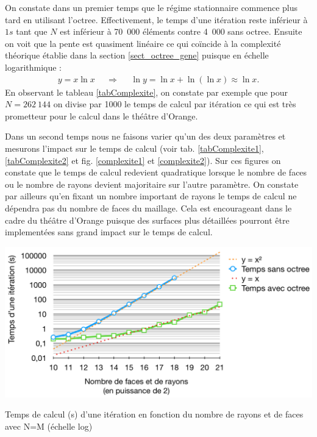 On constate dans un premier temps que le régime stationnaire commence plus tard en utilisant l'\gls{octree}. Effectivement, le temps d'une itération reste inférieur à $1s$ tant que $N$ est inférieur à 70~000 éléments contre 4~000 sans \gls{octree}. Ensuite on voit que la pente est quasiment linéaire ce qui coïncide à la complexité théorique établie dans la section \ref{sect_octree_gene} puisque en échelle logarithmique :
\begin {align*}
y = x\ln{x}  && \Rightarrow  && \ln{y} = \ln{x} + \ln{(\ln{x})} \approx \ln{x}.
\end{align*}
En observant le tableau \ref{tabComplexite}, on constate par exemple que pour $N = 262~144$ on divise par 1000 le temps de calcul par itération ce qui est très prometteur pour le calcul dans le théâtre d'Orange.

Dans un second temps nous ne faisons varier qu'un des deux paramètres et mesurons l'impact sur le temps de calcul (voir tab. \ref{tabComplexite1},  \ref{tabComplexite2} et fig. \ref{complexite1} et \ref{complexite2}). Sur ces figures on constate que le temps de calcul redevient quadratique lorsque le nombre de faces ou le nombre de rayons devient majoritaire sur l'autre paramètre. On constate par ailleurs qu'en fixant un nombre important de rayons le temps de calcul ne dépendra pas du nombre de faces du maillage. Cela est encourageant dans le cadre du théâtre d'Orange puisque des surfaces plus détaillées pourront être implementées sans grand impact sur le temps de calcul.

 \begin{figureth}
	\includegraphics[width=\linewidth]{images/complexite}
	\caption{Temps de calcul (s) d'une itération en fonction du nombre de rayons et de faces avec N=M (échelle log)}
	\label{complexite}
\end{figureth}

